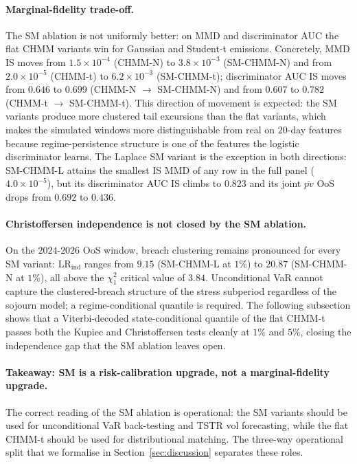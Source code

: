 \paragraph{Marginal-fidelity trade-off.}
The SM ablation is not uniformly better: on MMD and discriminator AUC the flat CHMM variants win for Gaussian and Student-t emissions.
Concretely, MMD IS moves from $1.5 \times 10^{-4}$ (CHMM-N) to $3.8 \times 10^{-3}$ (SM-CHMM-N) and from $2.0 \times 10^{-5}$ (CHMM-t) to $6.2 \times 10^{-3}$ (SM-CHMM-t); discriminator AUC IS moves from $0.646$ to $0.699$ (CHMM-N $\to$ SM-CHMM-N) and from $0.607$ to $0.782$ (CHMM-t $\to$ SM-CHMM-t).
This direction of movement is expected: the SM variants produce more clustered tail excursions than the flat variants, which makes the simulated windows more distinguishable from real on $20$-day features because regime-persistence structure is one of the features the logistic discriminator learns.
The Laplace SM variant is the exception in both directions: SM-CHMM-L attains the smallest IS MMD of any row in the full panel ($4.0 \times 10^{-5}$), but its discriminator AUC IS climbs to $0.823$ and its joint $\bar{pv}$ OoS drops from $0.692$ to $0.436$.

\paragraph{Christoffersen independence is not closed by the SM ablation.}
On the $2024$-$2026$ OoS window, breach clustering remains pronounced for every SM variant: $\text{LR}_{\text{ind}}$ ranges from $9.15$ (SM-CHMM-L at $1\%$) to $20.87$ (SM-CHMM-N at $1\%$), all above the $\chi^2_1$ critical value of $3.84$.
Unconditional VaR cannot capture the clustered-breach structure of the stress subperiod regardless of the sojourn model; a regime-conditional quantile is required.
The following subsection shows that a Viterbi-decoded state-conditional quantile of the flat CHMM-t passes both the Kupiec and Christoffersen tests cleanly at $1\%$ and $5\%$, closing the independence gap that the SM ablation leaves open.

\paragraph{Takeaway: SM is a risk-calibration upgrade, not a marginal-fidelity upgrade.}
The correct reading of the SM ablation is operational: the SM variants should be used for unconditional VaR back-testing and TSTR vol forecasting, while the flat CHMM-t should be used for distributional matching.
The three-way operational split that we formalise in Section~\ref{sec:discussion} separates these roles.

